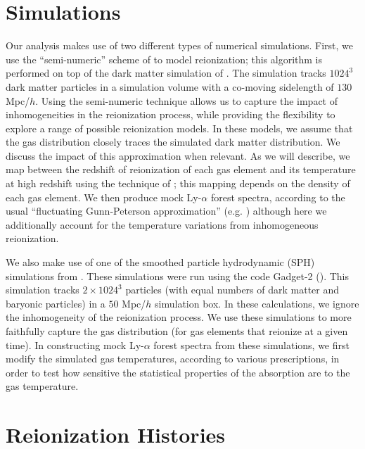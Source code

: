 \section{Simulations}
\label{sec:IGMTemperaturesims}

Our analysis makes use of two different types of numerical simulations. First, we use the ``semi-numeric'' scheme of
\citet{Zahn:2006sg} to model reionization; this algorithm is performed 
on top of the dark matter simulation of \citet{McQuinn:2007dy}. The \citet{McQuinn:2007dy} simulation
tracks $1024^3$ dark matter particles in a simulation volume with a co-moving sidelength of $130$ Mpc/$h$. 
Using the semi-numeric technique allows
us to capture the impact of inhomogeneities in the reionization process, while providing the flexibility to explore a range
of possible reionization models. In these models, we assume that the gas distribution closely traces the simulated dark
matter distribution. We discuss the impact of this approximation when relevant.
As we will describe,
we map between the redshift of reionization of each gas element and its temperature at high redshift using the technique
of \citet{Hui:1997dp}; this mapping depends on the density of each gas element. We then produce mock Ly-$\alpha$ forest
spectra, according to the usual ``fluctuating Gunn-Peterson approximation'' (e.g. \citealt{MiraldaEscude:1995bu,Croft:2000hs}) although here 
we additionally account for the temperature
variations from inhomogeneous reionization.

We also make use of one of the smoothed particle hydrodynamic (SPH) simulations from \citet{Lidz:2009ca}. These simulations 
were run using the code Gadget-2 (\citealt{2005MNRAS.364.1105S}). This simulation tracks $2\times 1024^3$ particles
(with equal numbers of dark matter and baryonic particles) in a $50$ Mpc/$h$ simulation box. In these calculations, we ignore
the inhomogeneity of the reionization process. We use these simulations to more faithfully capture the gas distribution (for
gas elements that reionize at a given time). In constructing mock Ly-$\alpha$ forest spectra from these simulations, we first
modify the simulated gas temperatures, according to various prescriptions, in order to test how sensitive the statistical properties of the
absorption are to the gas temperature.


\section{Reionization Histories}
\label{sec:IGMTemperaturereion_hist}


